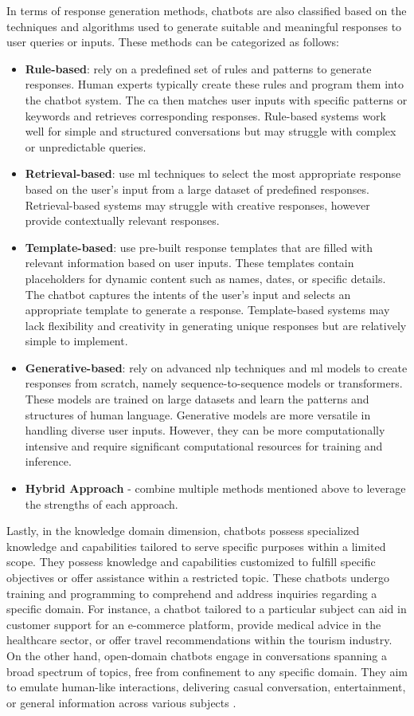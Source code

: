 \documentclass[a4paper,fleqn]{cas-sc}
\begin{document}
In terms of response generation methods, chatbots are also classified based on the techniques and algorithms used to generate suitable and meaningful responses to user queries or inputs. These methods can be categorized as follows:

\begin{itemize}
	\item \textbf{Rule-based}: rely on a predefined set of rules and patterns to generate responses. Human experts typically create these rules and program them into the chatbot system. The \gls{ca} then matches user inputs with specific patterns or keywords and retrieves corresponding responses. Rule-based systems work well for simple and structured conversations but may struggle with complex or unpredictable queries.
	\item \textbf{Retrieval-based}: use \gls{ml} techniques to select the most appropriate response based on the user's input from a large dataset of predefined responses. Retrieval-based systems may struggle with creative responses, however provide contextually relevant responses.
	\item \textbf{Template-based}:  use pre-built response templates that are filled with relevant information based on user inputs. These templates contain placeholders for dynamic content such as names, dates, or specific details. The chatbot captures the intents of the user's input and selects an appropriate template to generate a response. Template-based systems may lack flexibility and creativity in generating unique responses but are relatively simple to implement.
	\item \textbf{Generative-based}: rely on advanced \gls{nlp} techniques and \gls{ml} models to create responses from scratch, namely sequence-to-sequence models or transformers. These models are trained on large datasets and learn the patterns and structures of human language. Generative models are more versatile in handling diverse user inputs. However, they can be more computationally intensive and require significant computational resources for training and inference.
	\item \textbf{Hybrid Approach} - combine multiple methods mentioned above to leverage the strengths of each approach.
\end{itemize}

Lastly, in the knowledge domain dimension, chatbots possess specialized knowledge and capabilities tailored to serve specific purposes within a limited scope. They possess knowledge and capabilities customized to fulfill specific objectives or offer assistance within a restricted topic. These chatbots undergo training and programming to comprehend and address inquiries regarding a specific domain. For instance, a chatbot tailored to a particular subject can aid in customer support for an e-commerce platform, provide medical advice in the healthcare sector, or offer travel recommendations within the tourism industry. On the other hand, open-domain chatbots engage in conversations spanning a broad spectrum of topics, free from confinement to any specific domain. They aim to emulate human-like interactions, delivering casual conversation, entertainment, or general information across various subjects \cite{mohamad_2021}.
\end{document}
